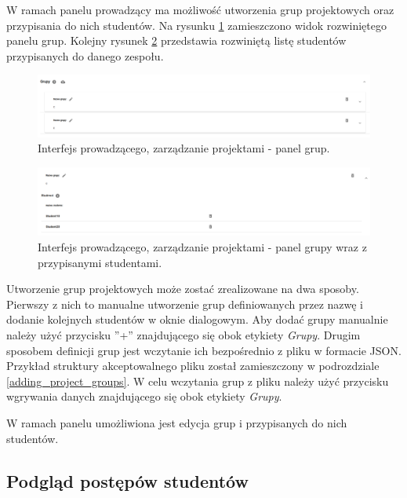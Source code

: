 W ramach panelu prowadzący ma możliwość utworzenia grup projektowych oraz przypisania do nich studentów.
Na rysunku \ref{fig:lecturer_groups} zamieszczono widok rozwiniętego panelu grup.
Kolejny rysunek \ref{fig:lecturer_students_in_group} przedstawia rozwiniętą listę studentów przypisanych do danego zespołu.

\begin{figure}[h]
    \centering
    \includegraphics[width = 15cm]{chapter04/lecturer_groups.png}
    \caption{Interfejs prowadzącego, zarządzanie projektami - panel grup.}
    \label{fig:lecturer_groups}
\end{figure}

\begin{figure}[h]
    \centering
    \includegraphics[width = 15cm]{chapter04/lecturer_students_in_group.png}
    \caption{Interfejs prowadzącego, zarządzanie projektami - panel grupy wraz z przypisanymi studentami.}
    \label{fig:lecturer_students_in_group}
\end{figure}

Utworzenie grup projektowych może zostać zrealizowane na dwa sposoby.
Pierwszy z nich to manualne utworzenie grup definiowanych przez nazwę i dodanie kolejnych studentów w oknie dialogowym.
Aby dodać grupy manualnie należy użyć przycisku ”+” znajdującego się obok etykiety \textit{Grupy}.
Drugim sposobem definicji grup jest wczytanie ich bezpośrednio z pliku w formacie JSON.
Przykład struktury akceptowalnego pliku został zamieszczony w podrozdziale \ref{adding_project_groups}.
W celu wczytania grup z pliku należy użyć przycisku wgrywania danych znajdującego się obok etykiety \textit{Grupy}.

W ramach panelu umożliwiona jest edycja grup i przypisanych do nich studentów.

\subsection{Podgląd postępów studentów}
\label{lecturer_preview}


